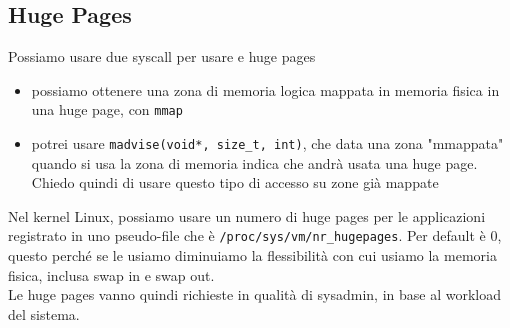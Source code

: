 \documentclass[12pt, oneside]{extbook}
\begin{document}
\subsection{Huge Pages}
Possiamo usare due syscall per usare e huge pages
\begin{itemize}
\item possiamo ottenere una zona di memoria logica mappata in memoria fisica in una huge page, con \texttt{mmap}
\item potrei usare \texttt{madvise(void*, size\_t, int)}, che data una zona "mmappata" quando si usa la zona di memoria indica che andrà usata una huge page. Chiedo quindi di usare questo tipo di accesso su zone già mappate
\end{itemize}
Nel kernel Linux, possiamo usare un numero di huge pages per le applicazioni registrato in uno pseudo-file che è \texttt{/proc/sys/vm/nr\_hugepages}. Per default è 0, questo perché se le usiamo diminuiamo la flessibilità con cui usiamo la memoria fisica, inclusa swap in e swap out.\\Le huge pages vanno quindi richieste in qualità di sysadmin, in base al workload del sistema.
\end{document}

